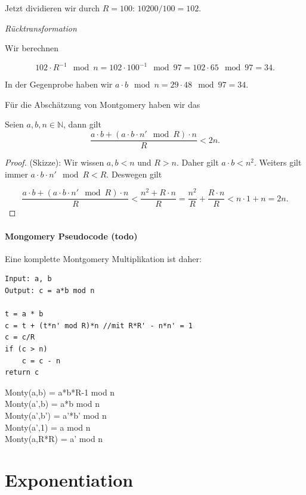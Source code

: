 Jetzt dividieren wir durch $R = 100$: $10200 / 100 = 102$.

\textit{Rücktransformation}

Wir berechnen 

$$102 \cdot R^{-1} \mod n = 102 \cdot 100^{-1} \mod 97 = 102 \cdot 65 \mod 97 = 34.$$

In der Gegenprobe haben wir $a \cdot b \mod n = 29 \cdot 48 \mod 97 = 34$.

Für die Abschätzung von Montgomery haben wir das 

\begin{lemma}
    Seien $a, b, n \in \mathbb{N}$, dann gilt 
    \begin{equation}
        \frac{a\cdot b + (a\cdot b\cdot n' \mod R) \cdot n}{R} < 2n.
    \end{equation}
\end{lemma}

\begin{proof} (Skizze):
    Wir wissen $a, b < n$ und $R > n$. Daher gilt $a\cdot b < n^2$. Weiters gilt immer $a\cdot b \cdot n' \mod R < R$. Deswegen gilt 

    $$\frac{a\cdot b + (a\cdot b\cdot n' \mod R) \cdot n}{R} < \frac{n^2 + R \cdot n}{R} = \frac{n^2}{R} + \frac{R\cdot n}{R} < n\cdot 1 + n = 2n.$$
\end{proof}

\paragraph{Mongomery Pseudocode (todo)}

Eine komplette Montgomery Multiplikation ist daher:

\begin{verbatim}
Input: a, b
Output: c = a*b mod n

t = a * b
c = t + (t*n' mod R)*n //mit R*R' - n*n' = 1
c = c/R
if (c > n)
    c = c - n
return c
\end{verbatim}

\begin{centering}
Monty(a,b) = a*b*R-1 mod n \\
Monty(a',b) = a*b mod n \\
Monty(a',b') = a'*b' mod n \\
Monty(a',1) = a mod n \\
Monty(a,R*R) = a' mod n 
\end{centering}

\section{Exponentiation}


